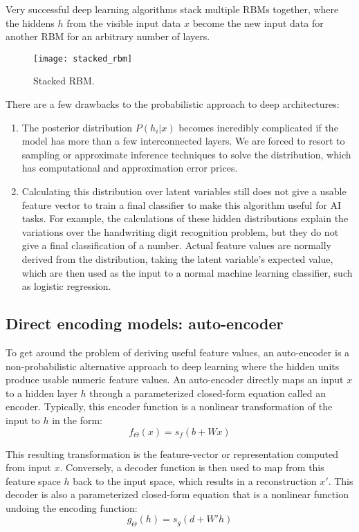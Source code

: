 Very successful deep learning algorithms stack multiple RBMs together, where the hiddens \(h\) from the visible input data \(x\) become the new input data for another RBM for an arbitrary number of layers. 

\begin{figure}[h!]
  \centering
    \texttt{[image: stacked\_rbm]}
\caption{Stacked RBM.}
\end{figure}

There are a few drawbacks to the probabilistic approach to deep architectures:
\begin{enumerate}
\item The posterior distribution \(P(h_i | x)\) becomes incredibly complicated if the model has more than a few interconnected layers. We are forced to resort to sampling or approximate inference techniques to solve the distribution, which has computational and approximation error prices.
\item Calculating this distribution over latent variables still does not give a usable feature vector to train a final classifier to make this algorithm useful for AI tasks. For example, the calculations of these hidden distributions explain the variations over the handwriting digit recognition problem, but they do not give a final classification of a number. Actual feature values are normally derived from the distribution, taking the latent variable's expected value, which are then used as the input to a normal machine learning classifier, such as logistic regression.
\end{enumerate}

\subsection{Direct encoding models: auto-encoder}
To get around the problem of deriving useful feature values, an auto-encoder is a non-probabilistic alternative approach to deep learning where the hidden units produce usable numeric feature values. An auto-encoder directly maps an input \(x\) to a hidden layer \(h\) through a parameterized closed-form equation called an encoder. Typically, this encoder function is a nonlinear transformation of the input to \(h\) in the form:
\[f_\Theta (x) = s_f (b + Wx)\]

This resulting transformation is the feature-vector or representation computed from input \(x\).
Conversely, a decoder function is then used to map from this feature space \(h\) back to the input space, which results in a reconstruction \(x'\). This decoder is also a parameterized closed-form equation that is a nonlinear function undoing the encoding function:
\[g_\Theta (h) = s_g (d + W' h)\]

